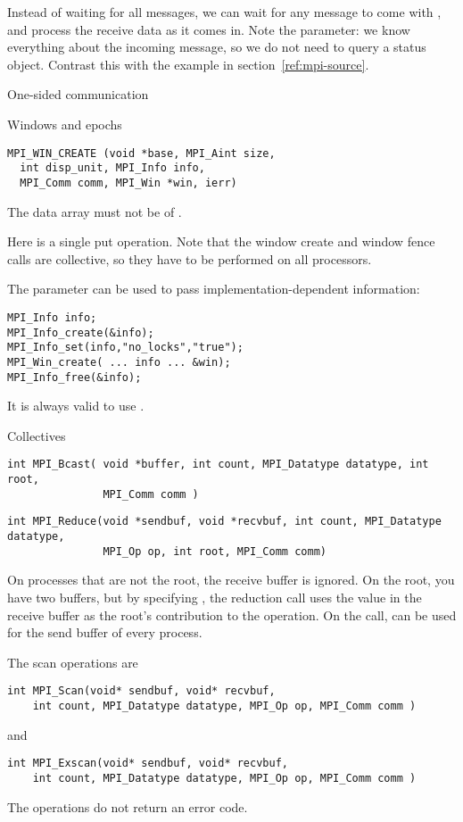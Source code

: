Instead of waiting for all messages, we can wait for any message to come
with , and process the receive data as it comes in.
Note the  parameter: we know everything
about the incoming message, so we do not need to query a status object.
Contrast this with the example in section~\ref{ref:mpi-source}.

 {One-sided communication}

 {Windows and epochs}

\begin{verbatim}
MPI_WIN_CREATE (void *base, MPI_Aint size, 
  int disp_unit, MPI_Info info, 
  MPI_Comm comm, MPI_Win *win, ierr)
\end{verbatim}
The data array must not be  of .

Here is a single put operation. Note that the window create and window fence calls
are collective, so they have to be performed on all processors.

The  parameter can be used to pass implementation-dependent 
information:
\begin{verbatim}
MPI_Info info;
MPI_Info_create(&info);
MPI_Info_set(info,"no_locks","true");
MPI_Win_create( ... info ... &win);
MPI_Info_free(&info);
\end{verbatim}
It is always valid to use .

 {Collectives}

\begin{verbatim}
int MPI_Bcast( void *buffer, int count, MPI_Datatype datatype, int root, 
               MPI_Comm comm )
\end{verbatim}

\begin{verbatim}
int MPI_Reduce(void *sendbuf, void *recvbuf, int count, MPI_Datatype datatype, 
               MPI_Op op, int root, MPI_Comm comm)
\end{verbatim}
On processes that are not the root, the receive buffer is ignored. On the root, 
you have two buffers, but by specifying , the reduction call
uses the value in the receive buffer as the root's contribution to the operation.
On the  call,  can be used for the send buffer of
every process.

The scan operations are
\begin{verbatim}
int MPI_Scan(void* sendbuf, void* recvbuf, 
    int count, MPI_Datatype datatype, MPI_Op op, MPI_Comm comm ) 
\end{verbatim}
and
\begin{verbatim}
int MPI_Exscan(void* sendbuf, void* recvbuf, 
    int count, MPI_Datatype datatype, MPI_Op op, MPI_Comm comm ) 
\end{verbatim}
The  operations do not return an error code.


